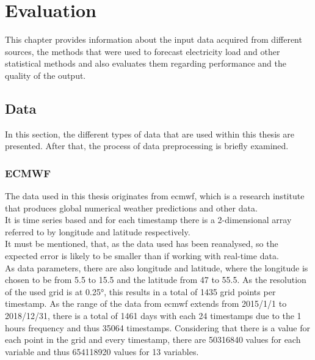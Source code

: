 \chapter{Evaluation}
\label{ch:Evaluation}

This chapter provides information about the input data acquired from different sources, the methods that were used to forecast electricity load and other statistical methods and also evaluates them regarding performance and the quality of the output.\\

\section{Data}
\label{sec:data}

In this section, the different types of data that are used within this thesis are presented. After that, the process of data preprocessing is briefly examined.\\


\subsection{ECMWF}

The data used in this thesis originates from \acrshort{ecmwf}, which is a research institute that produces global numerical weather predictions and other data.\\
It is time series based and for each timestamp there is a 2-dimensional array referred to by longitude and latitude respectively.\\

It must be mentioned, that, as the data used has been reanalysed, so the expected error is likely to be smaller than if working with real-time data.\\

As data parameters, there are also longitude and latitude, where the longitude is chosen to be from 5.5 to 15.5 and the latitude from 47 to 55.5. As the resolution of the used grid is at 0.25°, this results in a total of 1435 grid points per timestamp. As the range of the data from \acrshort{ecmwf} extends from 2015/1/1 to 2018/12/31, there is a total of 1461 days with each 24 timestamps due to the 1 hours frequency and thus 35064 timestamps. Considering that there is a value for each point in the grid and every timestamp, there are 50316840 values for each variable and thus 654118920 values for 13 variables.\\

